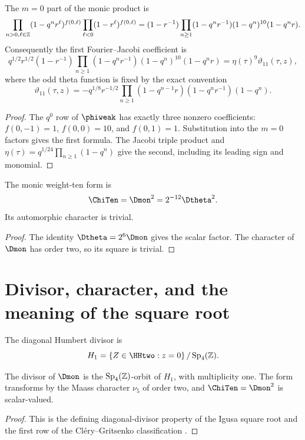 \begin{proposition}
The $m=0$ part of the monic product is
\[
 \prod_{n>0,\ell\in\mathbb Z}(1-q^nr^\ell)^{f(0,\ell)}
 \prod_{\ell<0}(1-r^\ell)^{f(0,\ell)}
 =(1-r^{-1})\prod_{n\ge1}
 (1-q^nr^{-1})(1-q^n)^{10}(1-q^nr).
\]
Consequently the first Fourier--Jacobi coefficient is
\[
 q^{1/2}r^{1/2}(1-r^{-1})
 \prod_{n\ge1}(1-q^nr^{-1})(1-q^n)^{10}(1-q^nr)
 =\eta(\tau)^9\vartheta_{11}(\tau,z),
\]
where the odd theta function is fixed by the exact convention
\[
 \vartheta_{11}(\tau,z)
 =-q^{1/8}r^{-1/2}
 \prod_{n\ge1}(1-q^{n-1}r)(1-q^nr^{-1})(1-q^n).
\]
\end{proposition}
\begin{proof}
The $q^0$ row of $\phiweak$ has exactly three nonzero coefficients:
$f(0,-1)=1$, $f(0,0)=10$, and $f(0,1)=1$. Substitution into the $m=0$ factors gives the first formula. The Jacobi triple product and $\eta(\tau)=q^{1/24}\prod_{n\ge1}(1-q^n)$ give the second, including its leading sign and monomial.
\end{proof}

\begin{corollary}
The monic weight-ten form is
\[
 \ChiTen=\Dmon^2=2^{-12}\Dtheta^2.
\]
Its automorphic character is trivial.
\end{corollary}
\begin{proof}
The identity $\Dtheta=2^6\Dmon$ gives the scalar factor.  The character of $\Dmon$ has order two, so its square is trivial.
\end{proof}

\chapter{Divisor, character, and the meaning of the square root}
The diagonal Humbert divisor is
\[
 H_1=\set{Z\in\HHtwo:z=0}/\operatorname{Sp}_4(\Z).
\]

\begin{theorem}
The divisor of $\Dmon$ is the $\operatorname{Sp}_4(\mathbb Z)$-orbit of $H_1$, with multiplicity one. The form transforms by the Maass character $\nu_5$ of order two, and $\ChiTen=\Dmon^2$ is scalar-valued.
\end{theorem}
\begin{proof}
This is the defining diagonal-divisor property of the Igusa square root and the first row of the Cl\'ery--Gritsenko classification \cite{Igusa62,Igusa64,GC}.
\end{proof}

